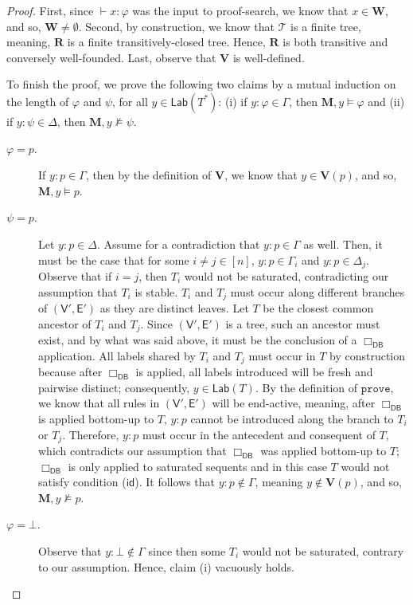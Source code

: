 \documentclass[copyright,creativecommons]{eptcs}
\newcommand{\tel}{\mathcal{T}}
\renewcommand{\phi}{\varphi}
\newcommand{\lab}{\mathsf{Lab}}
\newcommand{\id}{\mathsf{id}}
\newcommand{\sar}{\vdash}
\newcommand{\tseq}{T} %
\newcommand{\prove}{\mathtt{prove}}
\newcommand{\ndrule}{\Box_\mathsf{DB}}
\newcommand{\ctv}{\mathsf{V}}
\newcommand{\cte}{\mathsf{E}}
\newcommand{\M}{\mathbf{M}}
\newcommand{\W}{\mathbf{W}}
\newcommand{\R}{\mathbf{R}}
\newcommand{\V}{\mathbf{V}}
\begin{document}
\begin{proof}
First, since $\sar x : \phi$ was the input to proof-search, we know that $x \in \W$, and so, $\W \neq \emptyset$. Second, by construction, we know that $\tel$ is a finite tree, meaning, $\R$ is a finite transitively-closed tree. Hence, $\R$ is both transitive and conversely well-founded. Last, observe that $\V$ is well-defined. 

To finish the proof, we prove the following two claims by a mutual induction on the length of $\phi$ and $\psi$, for all $y \in \lab(\tseq^{*})$: (i) if $y : \phi \in \Gamma$, then $\M, y \models \phi$ and (ii) if $y : \psi \in \Delta$, then $\M, y \not\models \psi$.
\begin{description}

\item[$\phi = p.$] If $y : p \in \Gamma$, then by the definition of $\V$, we know that $y \in \V(p)$, and so, $\M, y \models p$.

\item[$\psi = p.$] Let $y : p \in \Delta$. Assume for a contradiction that $y : p \in \Gamma$ as well. Then, it must be the case that for some $i \neq j \in [n]$, $y : p \in \Gamma_{i}$ and $y : p \in \Delta_{j}$. Observe that if $i = j$, then $\tseq_{i}$ would not be saturated, contradicting our assumption that $\tseq_{i}$ is stable. $\tseq_{i}$ and $\tseq_{j}$ must occur along different branches of $(\ctv',\cte')$ as they are distinct leaves. Let $\tseq$ be the closest common ancestor of $\tseq_{i}$ and $\tseq_{j}$. Since $(\ctv',\cte')$ is a tree, such an ancestor must exist, and by what was said above, it must be the conclusion of a $\ndrule$ application. All labels shared by $\tseq_{i}$ and $\tseq_{j}$ must occur in $\tseq$ by construction because after $\ndrule$ is applied, all labels introduced will be fresh and pairwise distinct; consequently, $y \in \lab(\tseq)$. By the definition of $\prove$, we know that all rules in $(\ctv',\cte')$ will be end-active, meaning, after $\ndrule$ is applied bottom-up to $\tseq$, $y : p$ cannot be introduced along the branch to $\tseq_{i}$ or $\tseq_{j}$. Therefore, $y : p$ must occur in the antecedent and consequent of $\tseq$, which contradicts our assumption that $\ndrule$ was applied bottom-up to $\tseq$; $\ndrule$ is only applied to saturated sequents and in this case $\tseq$ would not satisfy condition ($\id$). It follows that $y : p \not\in \Gamma$, meaning $y \not\in \V(p)$, and so, $\M, y \not\models p$.

\item[$\phi = \bot.$] Observe that $y : \bot \not\in \Gamma$ since then some $\tseq_{i}$ would not be saturated, contrary to our assumption. Hence, claim (i) vacuously holds.


\end{description}
\end{proof}
\end{document}
